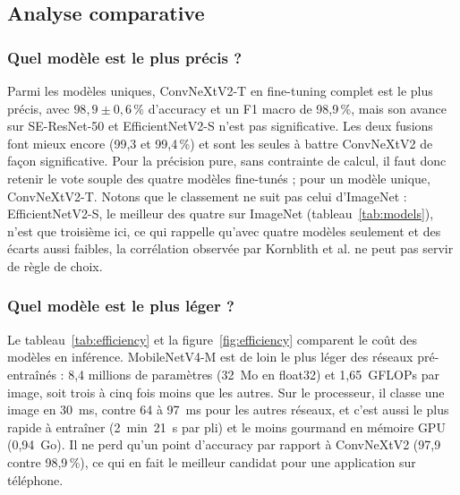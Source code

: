 \subsection{Analyse comparative}
\label{sec:analyse}

\subsubsection{Quel modèle est le plus précis ?}
\label{sec:precision}

Parmi les modèles uniques, ConvNeXtV2-T en fine-tuning complet est le plus précis, avec $98{,}9 \pm 0{,}6$\,\% d'accuracy et un F1 macro de 98,9\,\%, mais son avance sur SE-ResNet-50 et EfficientNetV2-S n'est pas significative. Les deux fusions font mieux encore (99,3 et 99,4\,\%) et sont les seules à battre ConvNeXtV2 de façon significative. Pour la précision pure, sans contrainte de calcul, il faut donc retenir le vote souple des quatre modèles fine-tunés ; pour un modèle unique, ConvNeXtV2-T. Notons que le classement ne suit pas celui d'ImageNet : EfficientNetV2-S, le meilleur des quatre sur ImageNet (tableau~\ref{tab:models}), n'est que troisième ici, ce qui rappelle qu'avec quatre modèles seulement et des écarts aussi faibles, la corrélation observée par Kornblith et al. \cite{kornblith2019better} ne peut pas servir de règle de choix.

\subsubsection{Quel modèle est le plus léger ?}
\label{sec:legerete}

Le tableau~\ref{tab:efficiency} et la figure~\ref{fig:efficiency} comparent le coût des modèles en inférence. MobileNetV4-M est de loin le plus léger des réseaux pré-entraînés : 8,4 millions de paramètres (32~Mo en float32) et 1,65~GFLOPs par image, soit trois à cinq fois moins que les autres. Sur le processeur, il classe une image en 30~ms, contre 64 à 97~ms pour les autres réseaux, et c'est aussi le plus rapide à entraîner (2~min~21~s par pli) et le moins gourmand en mémoire GPU (0,94~Go). Il ne perd qu'un point d'accuracy par rapport à ConvNeXtV2 (97,9 contre 98,9\,\%), ce qui en fait le meilleur candidat pour une application sur téléphone.

